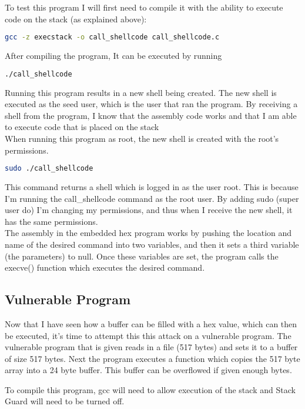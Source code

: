 \documentclass[14pt]{extarticle}
\begin{document}
To test this program I will first need to compile it with the ability to execute code on the stack (as explained above):
\begin{lstlisting}[language=bash]
	gcc -z execstack -o call_shellcode call_shellcode.c
\end{lstlisting}
After compiling the program, It can be executed by running
\begin{lstlisting}[language=bash]
    ./call_shellcode
\end{lstlisting}
Running this program results in a new shell being created. The new shell is executed as the seed user, which is the user that ran the program. By receiving a shell from the program, I know that the assembly code works and that I am able to execute code that is placed on the stack\\
When running this program as root, the new shell is created with the root's permissions.
\begin{lstlisting}[language=bash]
    sudo ./call_shellcode
\end{lstlisting}
This command returns a shell which is logged in as the user root. This is because I'm running the call_shellcode command as the root user. By adding sudo (super user do) I'm changing my permissions, and thus when I receive the new shell, it has the same permissions.\\
The assembly in the embedded hex program works by pushing the location and name of the desired command into two variables, and then it sets a third variable (the parameters) to null. Once these  variables are set, the program calls the execve() function which executes the desired command. 

\subsection{Vulnerable Program}
Now that I have seen how a buffer can be filled with a hex value, which can then be executed, it's time to attempt this this attack on a vulnerable program. The vulnerable program that is given reads in a file (517 bytes) and sets it to a buffer of size 517 bytes. Next the program executes a function which copies the 517 byte array into a 24 byte buffer. This buffer can be overflowed if given enough bytes. 

To compile this program, gcc will need to allow execution of the stack and Stack Guard will need to be turned off. 

\newpage

\newpage


\end{document}
